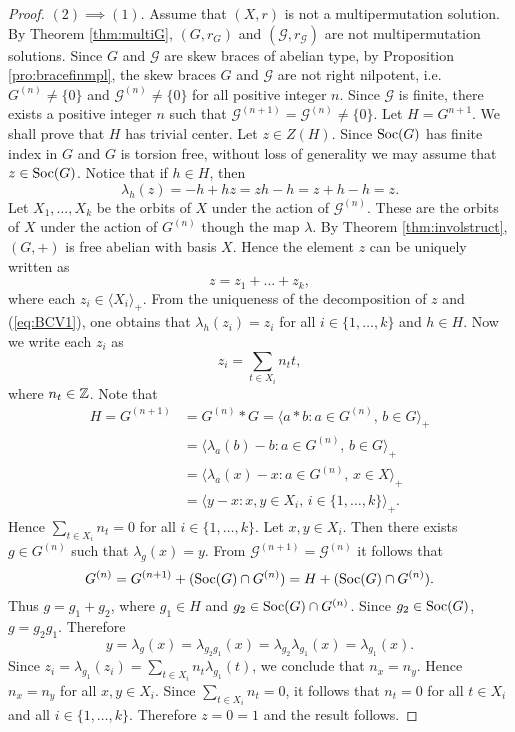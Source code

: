 \begin{proof}
$(2)\implies (1).$ Assume that $(X,r)$ is not a multipermutation solution. By Theorem \ref{thm:multiG}, $(G,r_G)$ and $(\mathcal{G},r_{\mathcal{G}})$ are not multipermutation solutions. Since $G$ and $\mathcal{G}$ are skew braces of abelian type, by Proposition \ref{pro:bracefinmpl},
the skew braces $G$ and $\mathcal{G}$ are not right nilpotent, i.e. $G^{(n)}\neq\{ 0\}$ and $\mathcal{G}^{(n)}\neq\{0\}$ for all positive integer $n$. Since $\mathcal{G}$ is finite, there exists a positive integer $n$ such that $\mathcal{G}^{(n+1)}=\mathcal{G}^{(n)}\neq \{0\}$. Let $H=G^{n+1}$. We shall prove that $H$ has trivial center. Let $z\in Z(H)$. Since $\operatorname{Soc}(G)$ has finite index in $G$ and $G$ is torsion free, without loss of generality we may assume that $z\in \operatorname{Soc}(G)$. Notice that if $h\in H$, then
\begin{equation}\label{eq:BCV1}
\lambda_h(z)=-h+hz=zh-h=z+h-h=z.
\end{equation}
Let $X_1,\dots ,X_k$ be the orbits of $X$ under the action of $\mathcal{G}^{(n)}$. These are the orbits of $X$ under the action of $G^{(n)}$ though the map $\lambda$. By Theorem \ref{thm:involstruct}, $(G,+)$ is free abelian with basis $X$. Hence the element $z$ can be uniquely written as
\[ z=z_1+\dots +z_k,\]
where each $z_i\in \langle X_i\rangle_+$. From the uniqueness of the decomposition of $z$ and (\ref{eq:BCV1}), one obtains that $\lambda_h(z_i)=z_i$ for all $i\in \{ 1,\dots ,k\}$ and $h\in H$. Now we write each $z_i$ as
\[ z_i=\sum_{t\in X_i}n_tt,\]
where $n_t\in\mathbb{Z}$. Note that
\begin{align*}
    H=G^{(n+1)}&=G^{(n)}*G=\langle a*b : a\in G^{(n)}, \, b\in G\rangle_+\\
    &=\langle \lambda_a(b)-b : a\in G^{(n)}, \, b\in G\rangle_+\\
    &=\langle \lambda_a(x)-x : a\in G^{(n)}, \, x\in X\rangle_+\\
    &=\langle y-x : x,y\in X_i, \, i\in \{1,\dots ,k\}\rangle_+.
\end{align*}
Hence $\sum_{t\in X_i}n_t=0$ for all $i\in\{ 1,\dots ,k\}$. Let $x,y\in X_i$. Then there exists $g\in G^{(n)}$ such that $\lambda_g(x)=y$. From $\mathcal{G}^{(n+1)}=\mathcal{G}^{(n)}$ it follows that
\[ G^{(n)}=G^{(n+1)}+(\operatorname{Soc}(G)\cap G^{(n)})=H+(\operatorname{Soc}(G)\cap G^{(n)}).\]
Thus $g=g_1+g_2$, where $g_1\in H$ and $g_2\in \operatorname{Soc}(G)\cap G^{(n)}$. Since $g_2\in\operatorname{Soc}(G)$, $g=g_2g_1$. Therefore
\[ y=\lambda_g(x)=\lambda_{g_2g_1}(x)=\lambda_{g_2}\lambda_{g_1}(x)=\lambda_{g_1}(x).\]
Since $z_i=\lambda_{g_1}(z_i)=\sum_{t\in X_i}n_t\lambda_{g_1}(t)$, we conclude that $n_x=n_y$. Hence $n_x=n_y$ for all $x,y\in X_i$. Since $\sum_{t\in X_i}n_t=0$, it follows that $n_t=0$ for all $t\in X_i$ and all $i\in \{ 1,\dots ,k\}$. Therefore $z=0=1$ and the result follows.
\end{proof}

